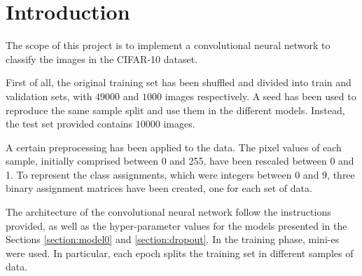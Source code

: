 \documentclass[a4paper,12pt]{article} %
\begin{document}
	

	\thispagestyle{empty}  
	\vspace{0.4cm}

	
	\section{Introduction}
	The scope of this project is to implement a convolutional neural network to 
	classify the images in the CIFAR-10 dataset.
	
	First of all, the original training set has been shuffled and divided into 
	train and validation sets, with $49000$ and $1000$ images respectively. A 
	seed has been used to reproduce the same sample split and use them in the 
	different models. Instead, the test set provided contains $10000$ images.
	
	A certain preprocessing has been applied to the data. The pixel values of 
	each sample, initially comprised between 0 and 255, have been rescaled 
	between 0 and 1. To represent the class assignments, which were integers 
	between 0 and 9, three binary assignment matrices have been created, one 
	for each set of data. 
	
	The architecture of the convolutional neural network follow the 
	instructions provided, as well as the hyper-parameter values for the models 
	presented in the Sections \ref{section:model0} and \ref{section:dropout}.
	In the training phase, mini-es were used. In particular, each 
	epoch splits the training set in different samples of data.
	
\end{document}
